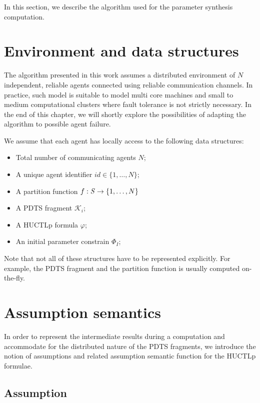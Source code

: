 In this section, we describe the algorithm used for the parameter synthesis computation.

\section{Environment and data structures}

The algorithm presented in this work assumes a distributed environment of $N$ independent, reliable agents connected using reliable communication channels. In practice, such model is suitable to model multi core machines and small to medium computational clusters where fault tolerance is not strictly necessary. In the end of this chapter, we will shortly explore the possibilities of adapting the algorithm to possible agent failure. 

We assume that each agent has locally access to the following data structures:

\begin{itemize}
	\item Total number of communicating agents $N$;
	\item A unique agent identifier $id \in \{ 1, \ldots, N \}$;
	\item A partition function $f : \mathit{S} \to \{1, \ldots, N \}$
	\item A \ac{PDTS} fragment $\mathcal{K}_i$;
	\item A \ac{HUCTLp} formula $\varphi$;
	\item An initial parameter constrain $\Phi_I$;
\end{itemize}

Note that not all of these structures have to be represented explicitly. For example, the \ac{PDTS} fragment and the partition function is usually computed on-the-fly.

\section{Assumption semantics}

In order to represent the intermediate results during a computation and accommodate for the distributed nature of the \ac{PDTS} fragments, we introduce the notion of assumptions and related assumption semantic function for the \ac{HUCTLp} formulae.

\subsection{Assumption}

